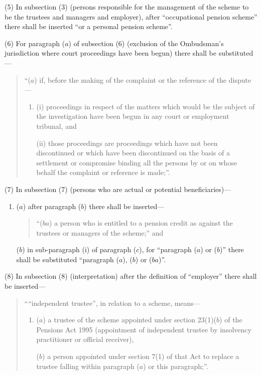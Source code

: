 \documentclass[12pt,a4paper]{article}
\begin{document}
(5) In subsection (3)  (persons responsible for the management of the scheme to be the trustees and managers and employer), after “occupational pension scheme” there shall be inserted “or a personal pension scheme”.

(6) For paragraph ($a$)  of subsection (6)  (exclusion of the Ombudsman’s jurisdiction where court proceedings have been begun) there shall be substituted—
\begin{quotation}
“($a$) if, before the making of the complaint or the reference of the dispute—
\begin{enumerate}\item[]
(i) proceedings in respect of the matters which would be the subject of the investigation have been begun in any court or employment tribunal, and

(ii) those proceedings are proceedings which have not been discontinued or which have been discontinued on the basis of a settlement or compromise binding all the persons by or on whose behalf the complaint or reference is made;”.
\end{enumerate}
\end{quotation}

(7) In subsection (7)  (persons who are actual or potential beneficiaries)—
\begin{enumerate}\item[]
($a$) after paragraph ($b$)  there shall be inserted—
\begin{quotation}
“($ba$) a person who is entitled to a pension credit as against the trustees or managers of the scheme;” and
\end{quotation}

($b$) in sub-paragraph (i)  of paragraph ($c$), for “paragraph ($a$)  or ($b$)” there shall be substituted “paragraph ($a$), ($b$)  or ($ba$)”.
\end{enumerate}

(8) In subsection (8)  (interpretation) after the definition of “employer” there shall be inserted—
\begin{quotation}
““independent trustee”, in relation to a scheme, means—
\begin{enumerate}\item[]
($a$) a trustee of the scheme appointed under section 23(1)($b$)  of the Pensions Act 1995 (appointment of independent trustee by insolvency practitioner or official receiver),

($b$) a person appointed under section 7(1)  of that Act to replace a trustee falling within paragraph ($a$)  or this paragraph;”.
\end{enumerate}
\end{quotation}
\end{document}

